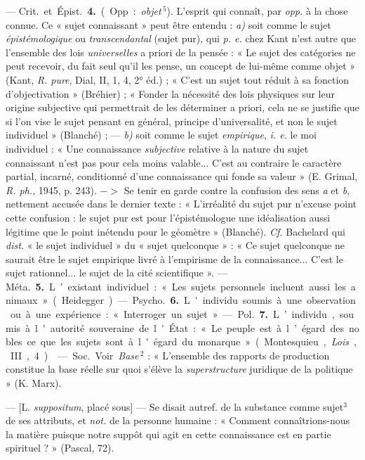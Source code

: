 \begin{itemize}[leftmargin=1cm, label=, itemsep=1pt]
—  \si{Crit.} et \si{Épist.} {\bf 4.} (Opp. :
{\it objet}$\,^5$). L'esprit qui connaît, par {\it opp.} à la chose connue. Ce
« sujet connaissant » peut être entendu : {\it a)} soit comme le sujet {\it
épistémologique} ou {\it transcendantal} (sujet pur), qui {\it p. e.} chez
Kant n’est autre que l’ensemble des lois {\it universelles} a priori de la
pensée : « Le sujet des catégories ne peut recevoir, du fait seul qu'il les
pense, un concept de lui-même comme objet » (Kant, {\it R. pure}, Dial, II,
1, 4, 2° éd.) ; « C’est un sujet tout réduit à sa fonction d’objectivation
» (Bréhier) ; « Fonder la nécessité des lois physiques sur leur origine
subjective qui permettrait de les déterminer a priori, cela ne se justifie
que si l'on vise le sujet pensant en général, principe d'universalité, et
non le sujet individuel » (Blanché) ; — {\it b)} soit comme le sujet {\it
empirique}, {\it i. e.} le moi individuel : « Une connaissance {\it
subjective} relative à la nature du sujet connaissant n’est pas pour cela
moins valable... C'est au contraire le caractère partial, incarné,
conditionné d’une connaissance qui fonde sa valeur » (E. Grimal, {\it R.
ph.}, 1945, p. 243). $->$ Se
tenir en garde contre la confusion des sens {\it a} et {\it b}, nettement
accusée dans le dernier texte : « L’irréalité du sujet pur n’excuse point
cette confusion : le sujet pur est pour l’épistémologue une idéalisation
aussi légitime que le point inétendu pour le géomètre » (Blanché). {\it Cf.}
Bachelard qui {\it dist.} « le sujet individuel » du « sujet quelconque » :
« Ce sujet quelconque ne saurait être le sujet empirique livré à l’empirisme
de la connaissance... C'est le sujet rationnel... le sujet de la cité
scientifique ». — \si{Méta.} {\bf 5.} L’existant individuel : « Les sujets
personnels incluent aussi les animaux » (Heidegger).

— \si{Psycho.} {\bf 6.} L'individu soumis
à une observation ou à une expérience : « Interroger un sujet. »

— \si{Pol.} {\bf 7.} L’individu, soumis à l'autorité souveraine de l'État :
« Le peuple est à l’égard des nobles ce que les sujets sont à l'égard du
monarque » (Montesquieu, {\it Lois}, III, 4).

 — \si{Soc.} Voir {\it Base}$\,^2$ :
« L'ensemble des rapports de production constitue la base réelle sur
quoi s'élève la {\it superstructure} juridique de la politique » (K. Marx).

 — [L. {\it suppositum}, placé sous] — Se disait autref. de la
substance comme sujet$^3$ de ses attributs, et {\it not.} de la personne
humaine : « Comment connaîtrions-nous la matière puisque notre suppôt qui
agit en cette connaissance est en partie spirituel ? » (Pascal, 72).


\end{itemize}
